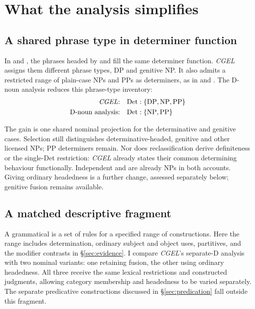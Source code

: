 \documentclass[12pt]{article}
\begin{document}
\section{What the analysis simplifies}\label{sec:economy}

\subsection{A shared phrase type in determiner function}\label{sec:det-uniform}

In  and , the phrases headed by  and  fill the same determiner function. \textit{CGEL} assigns them different phrase types, DP and genitive NP. It also admits a restricted range of plain-case NPs and PPs as determiners, as in  and  \citep[Ch.~5, §4]{huddleston2002}. The D-noun analysis reduces this phrase-type inventory:
\[
\begin{aligned}
\text{\textit{CGEL}:} &\quad \mathrm{Det}:\{\mathrm{DP},\mathrm{NP},\mathrm{PP}\} \\
\text{D-noun analysis:} &\quad \mathrm{Det}:\{\mathrm{NP},\mathrm{PP}\}
\end{aligned}
\]

The gain is one shared nominal projection for the determinative and genitive cases. Selection still distinguishes determinative-headed, genitive and other licensed NPs; PP determiners remain. Nor does reclassification derive definiteness or the single-Det restriction: \textit{CGEL} already states their common determining behaviour functionally. Independent  and  are already NPs in both accounts. Giving  ordinary headedness is a further change, assessed separately below; genitive fusion remains available.

\subsection{A matched descriptive fragment}\label{sec:fragment}

A grammatical  is a set of rules for a specified range of constructions. Here the range includes determination, ordinary subject and object uses, partitives, and the modifier contrasts in §\ref{sec:evidence}. I compare \textit{CGEL}'s separate-D analysis with two nominal variants: one retaining fusion, the other using ordinary headedness. All three receive the same lexical restrictions and constructed judgments, allowing category membership and headedness to be varied separately. The separate predicative constructions discussed in §\ref{sec:predication} fall outside this fragment.
\end{document}
